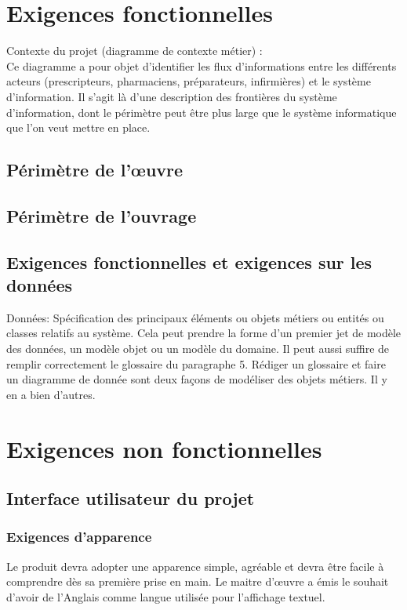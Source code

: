 	\section{Exigences fonctionnelles}
		{\color{red}
		Contexte du projet (diagramme de contexte métier) :\\	 
		Ce diagramme a pour objet d’identifier les flux d’informations entre les différents acteurs (prescripteurs, pharmaciens, préparateurs, infirmières) et le système d’information.
		Il s’agit là d’une description des frontières du système d’information, dont le périmètre peut être plus large que le système informatique que l’on veut mettre en place.
		}

		\subsection{Périmètre de l'œuvre}
		
		\subsection{Périmètre de l'ouvrage}

		\subsection{Exigences fonctionnelles et exigences sur les données}	
		{\color{red}
		Données: Spécification des principaux éléments ou objets métiers ou entités ou classes relatifs au système. Cela peut prendre la forme d’un premier jet de modèle des données, un modèle objet ou un modèle du domaine. Il peut aussi suffire de remplir correctement le glossaire du paragraphe 5. Rédiger un glossaire et faire un diagramme de donnée sont deux façons de modéliser des objets métiers. Il y en a bien d’autres.\\
		}
	
	\section{Exigences non fonctionnelles}
		\subsection{Interface utilisateur du projet}
		
		\subsubsection{Exigences d’apparence} 
		Le produit devra adopter une apparence simple, agréable et devra être facile à comprendre dès sa première prise en main.
		Le maitre d’œuvre a émis le souhait d’avoir de l’Anglais comme langue utilisée pour l’affichage textuel.

